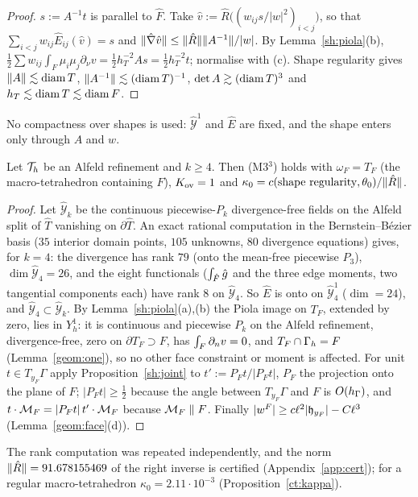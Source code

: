 \begin{proof}
$s:=A^{-1}t$ is parallel to $\hat F$. Take $\hat v:=\hat R\bigl((w_{ij}s/|w|^2)_{i<j}\bigr)$, so that $\sum_{i<j}w_{ij}\hat E_{ij}(\hat v)=s$ and $\lVert \hat\nabla\hat v\rVert\le\lVert \hat R\rVert\lVert A^{-1}\rVert/|w|$. By Lemma~\ref{sh:piola}(b), $\frac12\sum w_{ij}\int_F\mu_i\mu_j\partial_\nu v=\frac12h_T^{-2}As=\frac12h_T^{-2}t$; normalise with (c). Shape regularity gives $\lVert A\rVert\lesssim\operatorname{diam} T$, $\lVert A^{-1}\rVert\lesssim(\operatorname{diam} T)^{-1}$, $\det A\gtrsim(\operatorname{diam} T)^3$ and $h_T\lesssim\operatorname{diam} T\lesssim\operatorname{diam} F$.
\end{proof}
No compactness over shapes is used: $\hat{\mathcal Y}^1$ and $\hat E$ are fixed, and the shape enters only through $A$ and $w$.

\begin{theorem}\label{sh:alfeld}
Let $\mathcal T_h$ be an Alfeld refinement and $k\ge4$. Then (M3$^3$) holds with $\omega_F=T_F$ (the macro-tetrahedron containing $F$), $K_{\rm ov}=1$ and $\kappa_0=c(\text{shape regularity},\theta_0)/\lVert \hat R\rVert$. 
\end{theorem}

\begin{proof}
Let $\hat{\mathcal Y}_k$ be the continuous piecewise-$P_k$ divergence-free fields on the Alfeld split of $\hat T$ vanishing on $\partial\hat T$. An exact rational computation in the Bernstein--B\'ezier basis ($35$ interior domain points, $105$ unknowns, $80$ divergence equations) gives, for $k=4$: the divergence has rank $79$ (onto the mean-free piecewise $P_3$), $\dim\hat{\mathcal Y}_4=26$, and the eight functionals ($\int_{\hat F}\hat g$ and the three edge moments, two tangential components each) have rank $8$ on $\hat{\mathcal Y}_4$. So $\hat E$ is onto on $\hat{\mathcal Y}^1_4$ ($\dim=24$), and $\hat{\mathcal Y}_4\subset\hat{\mathcal Y}_k$. By Lemma~\ref{sh:piola}(a),(b) the Piola image on $T_F$, extended by zero, lies in $Y_h^1$: it is continuous and piecewise $P_k$ on the Alfeld refinement, divergence-free, zero on $\partial T_F\supset F$, has $\int_F\partial_n v=0$, and $T_F\cap\Gamma_h=F$ (Lemma~\ref{geom:one}), so no other face constraint or moment is affected. For unit $t\in T_{y_F}\Gamma$ apply Proposition~\ref{sh:joint} to $t':=P_Ft/|P_Ft|$, $P_F$ the projection onto the plane of $F$; $|P_Ft|\ge\frac12$ because the angle between $T_{y_F}\Gamma$ and $F$ is $O(h_\Gamma)$, and $t\cdot\mathcal M_F=|P_Ft|\,t'\cdot\mathcal M_F$ because $\mathcal M_F\parallel F$. Finally $|w^F|\ge c\ell^2|\mathfrak h_{y_F}|-C\ell^3$ (Lemma~\ref{geom:face}(d)).
\end{proof}
The rank computation was repeated independently, and the norm $\lVert \hat R\rVert=91.678155469$ of the right inverse is certified (Appendix~\ref{app:cert}); for a regular macro-tetrahedron $\kappa_0=2.11\cdot10^{-3}$ (Proposition~\ref{ct:kappa}).

